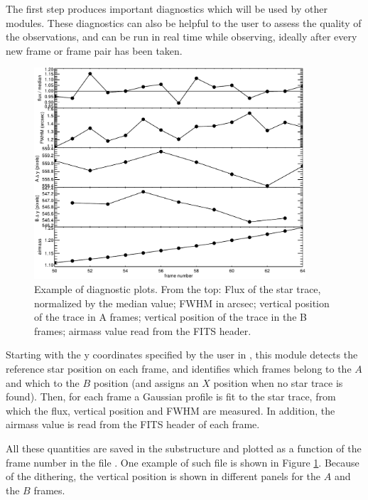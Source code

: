 \documentclass[a4paper]{article}
\begin{document}
The first step produces important diagnostics which will be used by other modules. These diagnostics can also be helpful to the user to assess the quality of the observations, and can be run in real time while observing, ideally after every new frame or frame pair has been taken.

\begin{figure}[htbp]
\centering
\includegraphics[width=0.9\textwidth]{diagnostics}
\caption{Example of diagnostic plots. From the top: Flux of the star trace, normalized by the median value; FWHM in arcsec; vertical position of the trace in A frames; vertical position of the trace in the B frames; airmass value read from the FITS header.}
\label{fig:diagnostics}
\end{figure}

Starting with the y coordinates specified by the user in , this module detects the reference star position on each frame, and identifies which frames belong to the $A$ and which to the $B$ position (and assigns an $X$ position when no star trace is found). Then, for each frame a Gaussian profile is fit to the star trace, from which the flux, vertical position and FWHM are measured. In addition, the airmass value is read from the FITS header of each frame.

All these quantities are saved in the substructure  and plotted as a function of the frame number in the file . One example of such file is shown in Figure \ref{fig:diagnostics}. Because of the dithering, the vertical position is shown in different panels for the $A$ and the $B$ frames.
\end{document}
